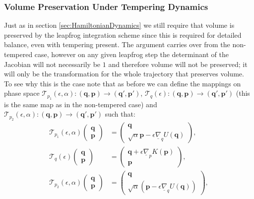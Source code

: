 \documentclass[12pt]{article}
\begin{document}
    \subsubsection{Volume Preservation Under Tempering Dynamics}
    Just as in section \ref{sec:HamiltonianDynamics} we still require that volume is preserved by the leapfrog integration scheme since this is required for detailed balance, even with tempering present. The argument carries over from the non-tempered case, however on any given leapfrog step the determinant of the Jacobian will not necessarily be $1$ and therefore volume will not be preserved; it will only be the transformation for the whole trajectory that preserves volume. To see why this is the case note that as before we can define the mappings on phase space $\mathcal{T}_{p_1}\left(\epsilon,\alpha\right): \left(\bm{q},\bm{p}\right) \rightarrow \left(\bm{q}',\bm{p}'\right)$, $\mathcal{T}_{q}\left(\epsilon\right): \left(\bm{q},\bm{p}\right) \rightarrow \left(\bm{q}',\bm{p}'\right)$ (this is the same map as in the non-tempered case) and $\mathcal{T}_{p_2}\left(\epsilon,\alpha\right): \left(\bm{q},\bm{p}\right) \rightarrow \left(\bm{q}',\bm{p}'\right)$ such that:
    \begin{align}
        \mathcal{T}_{p_1}\left(\epsilon,\alpha\right)\begin{pmatrix} \bm{q} \\ \bm{p} \end{pmatrix} & = \begin{pmatrix} \bm{q} \\ \sqrt{\alpha}\bm{p} - \epsilon \underline{\nabla}_{q}U\left(\bm{q}\right)\end{pmatrix},\\
        \mathcal{T}_{q}\left(\epsilon\right)\begin{pmatrix} \bm{q} \\ \bm{p} \end{pmatrix} & = \begin{pmatrix} \bm{q} + \epsilon \underline{\nabla}_pK\left(\bm{p}\right)  \\ \bm{p} \end{pmatrix},\\
        \mathcal{T}_{p_2}\left(\epsilon,\alpha\right)\begin{pmatrix} \bm{q} \\ \bm{p} \end{pmatrix} & = \begin{pmatrix} \bm{q} \\ \sqrt{\alpha}\left(\bm{p} - \epsilon \underline{\nabla}_qU\left(\bm{q}\right)\right)\end{pmatrix},
    \end{align}
\end{document}
